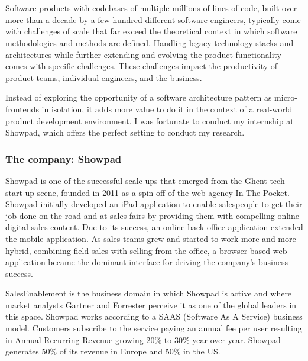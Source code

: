 
\chapter{}
\label{ch:inleiding}

Software products with codebases of multiple millions of lines of code, built over more than a decade by a few hundred different software engineers, typically come with challenges of scale that far exceed the theoretical context in which software methodologies and methods are defined. Handling legacy technology stacks and architectures while further extending and evolving the product functionality comes with specific challenges. These challenges impact the productivity of product teams, individual engineers, and the business.

Instead of exploring the opportunity of a software architecture pattern as micro-frontends in isolation, it adds more value to do it in the context of a real-world product development environment. I was fortunate to conduct my internship at Showpad, which offers the perfect setting to conduct my research.
\subsection{The company: Showpad}
Showpad is one of the successful scale-ups that emerged from the Ghent tech start-up scene, founded in 2011 as a spin-off of the web agency In The Pocket. Showpad initially developed an iPad application to enable salespeople to get their job done on the road and at sales fairs by providing them with compelling online digital sales content. Due to its success,  an online back office application extended the mobile application. As sales teams grew and started to work more and more hybrid, combining field sales with selling from the office, a browser-based web application became the dominant interface for driving the company's business success.

\gls{SalesEnablement} is the business domain in which Showpad is active and where market analysts Gartner and Forrester perceive it as one of the global leaders in this space. Showpad works according to a \gls{SAAS} (Software As A Service) business model. Customers subscribe to the service paying an annual fee per user resulting in Annual Recurring Revenue growing 20\% to 30\% year over year. Showpad generates 50\% of its revenue in Europe and 50\% in the US.

